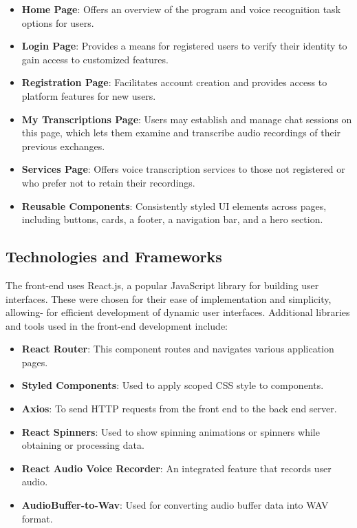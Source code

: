 \documentclass[conference]{IEEEtran}
\begin{document}
\begin{itemize}
\item \textbf{Home Page}: Offers an overview of the program and voice recognition task options for users.
    \item \textbf{Login Page}: Provides a means for registered users to verify their identity to gain access to customized features.
    \item \textbf{Registration Page}: Facilitates account creation and provides access to platform features for new users. 
    \item \textbf{My Transcriptions Page}: Users may establish and manage chat sessions on this page, which lets them examine and transcribe audio recordings of their previous exchanges.
    \item \textbf{Services Page}: Offers voice transcription services to those not registered or who prefer not to retain their recordings.
    \item \textbf{Reusable Components}: Consistently styled UI elements across pages, including buttons, cards, a footer, a navigation bar, and a hero section.
\end{itemize}

\subsection{Technologies and Frameworks}

The front-end uses React.js, a popular JavaScript library for building user interfaces. These were chosen for their ease of implementation and simplicity, allowing-
for efficient development of dynamic user interfaces. Additional libraries and tools used in the front-end development include:

\begin{itemize}
\item \textbf{React Router}: This component routes and navigates various application pages.
    \item \textbf{Styled Components}: Used to apply scoped CSS style to components.
     \item \textbf{Axios}: To send HTTP requests from the front end to the back end server.
    \item \textbf{React Spinners}: Used to show spinning animations or spinners while obtaining or processing data.
    \item\textbf{React Audio Voice Recorder}: An integrated feature that records user audio.
    \item \textbf{AudioBuffer-to-Wav}: Used for converting audio buffer data into WAV format.
\end{itemize}
\end{document}

